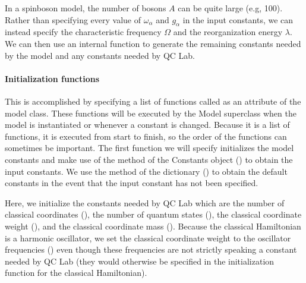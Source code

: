 \documentclass[letterpaper,10pt,english]{sphinxmanual}
\begin{document}
\sphinxAtStartPar
In a spin\sphinxhyphen{}boson model, the number of bosons \(A\) can be quite large (e.g, 100). Rather than specifying every value of \(\omega_{\alpha}\)
and \(g_{\alpha}\) in the input constants, we can instead specify the characteristic frequency \(\Omega\) and the reorganization energy \(\lambda\).
We can then use an internal function to generate the remaining constants needed by the model and any constants needed by QC Lab.


\paragraph{Initialization functions}
\label{\detokenize{user_guide/model_dev:initialization-functions}}
\sphinxAtStartPar
This is accomplished by specifying a list of functions called  as an attribute of the model class. These functions will
be executed by the Model superclass when the model is instantiated or whenever a constant is changed. Because it is a list of functions, it is executed
from start to finish, so the order of the functions can sometimes be important. The first function we will specify initializes the model constants and make
use of the  method of the Constants object () to obtain the input constants. We use the  method of the
 dictionary () to obtain the default constants in the event that the input constant has not been specified.

\sphinxAtStartPar
Here, we initialize the constants needed by QC Lab which are the number of classical coordinates (),
the number of quantum states (), the classical coordinate weight (),
and the classical coordinate mass (). Because the classical Hamiltonian is a harmonic oscillator,
we set the classical coordinate weight to the oscillator frequencies () even though these frequencies are not strictly speaking a
constant needed by QC Lab (they would otherwise be specified in the initialization function for the classical Hamiltonian).
\end{document}
